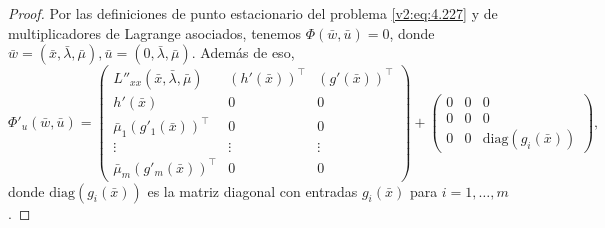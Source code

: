 \begin{proof}
Por las definiciones de punto estacionario del problema \eqref{v2:eq:4.227} y de multiplicadores de Lagrange asociados, tenemos $\Phi(\bar{w}, \bar{u}) = 0$, donde $\bar{w} = (\bar{x}, \bar{\lambda}, \bar{\mu}), \bar{u} = (0, \bar{\lambda}, \bar{\mu})$. Además de eso,
\[
\Phi'_u(\bar{w}, \bar{u}) = \begin{pmatrix} L''_{xx}(\bar{x}, \bar{\lambda}, \bar{\mu}) & (h'(\bar{x}))^\top & (g'(\bar{x}))^\top \\ h'(\bar{x}) & 0 & 0 \\ \bar{\mu}_1 (g'_1(\bar{x}))^\top & 0 & 0 \\ \vdots & \vdots & \vdots \\ \bar{\mu}_m (g'_m(\bar{x}))^\top & 0 & 0 \end{pmatrix} + \begin{pmatrix} 0 & 0 & 0 \\ 0 & 0 & 0 \\ 0 & 0 & \mathrm{diag}(g_i(\bar{x})) \end{pmatrix},
\]
donde $\mathrm{diag}(g_i(\bar{x}))$ es la matriz diagonal con entradas $g_i(\bar{x})$ para $i=1,\dots,m$.


\end{proof}
